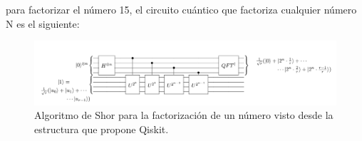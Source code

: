para factorizar el número 15, el circuito cuántico que factoriza cualquier número N es el siguiente:
\begin{figure}[H]
    \centering
    \includegraphics[scale=0.3]{../Graphics/shor_circuit.png}
    \caption{Algoritmo de Shor para la factorización de un número visto desde la estructura que propone Qiskit.}
    \label{fig:shorcircuit}
\end{figure}